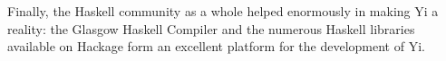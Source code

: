 \documentclass[9pt,indentedstyle]{sigplanconf}
\begin{document}
Finally, the Haskell community as a whole helped enormously in making
Yi a reality: the Glasgow Haskell Compiler and the numerous Haskell
libraries available on Hackage \cite{Hackage} form an excellent
platform for the development of Yi.



\end{document}

